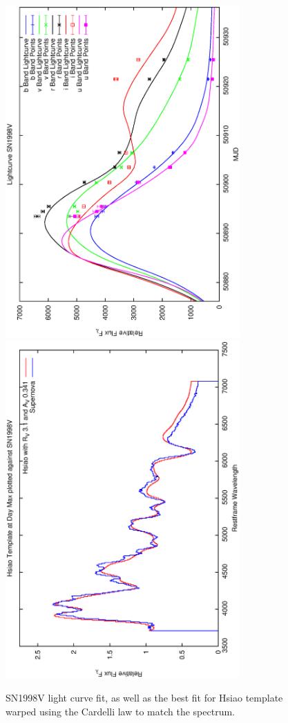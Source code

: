\clearpage

\begin{figure}[p]
\centering
\includegraphics[angle=-90,width=0.8\textwidth]{./figures/ltcv/SN1998V_v023_lightcurve.ps}
\hfill
\includegraphics[angle=-90,width=0.8\textwidth]{./figures/hsiao/SN1998V_v001_hsiao.ps}
\hfill
\caption{SN1998V light curve fit, as well as the best fit for Hsiao template warped using the Cardelli law to match the spectrum.}
\label{fig:SN1998Vfour2}
\end{figure}

